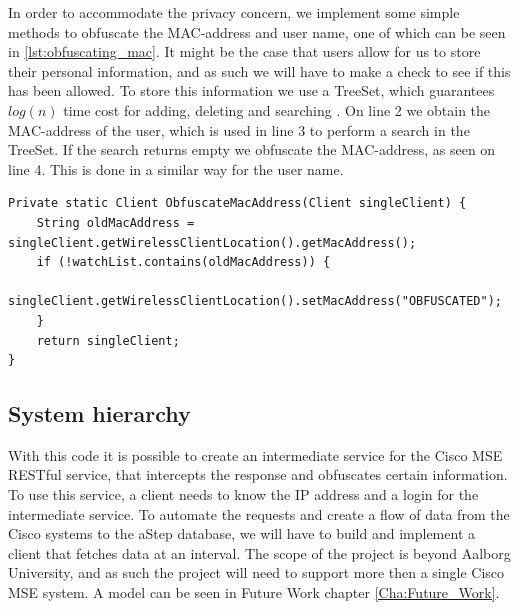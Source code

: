 In order to accommodate the privacy concern, we implement some simple methods to obfuscate the MAC-address and user name, one of which can be seen in \cref{lst:obfuscating_mac}. It might be the case that users allow for us to store their personal information, and as such we will have to make a check to see if this has been allowed. To store this information we use a TreeSet, which guarantees $log(n)$ time cost for adding, deleting and searching \cite{treeset}. On line 2 we obtain the MAC-address of the user, which is used in line 3 to perform a search in the TreeSet. If the search returns empty we obfuscate the MAC-address, as seen on line 4. This is done in a similar way for the user name.

\begin{lstlisting}[caption={Obfuscating mac-address},label={lst:obfuscating_mac},language=inc_Java]
Private static Client ObfuscateMacAddress(Client singleClient) {
    String oldMacAddress = singleClient.getWirelessClientLocation().getMacAddress();
    if (!watchList.contains(oldMacAddress)) {
        singleClient.getWirelessClientLocation().setMacAddress("OBFUSCATED");
    }
    return singleClient;
}
\end{lstlisting}

\subsection{System hierarchy}\label{subsec:system_hierarchy}
With this code it is possible to create an intermediate service for the Cisco MSE RESTful service, that intercepts the response and obfuscates certain information. To use this service, a client needs to know the IP address and a login for the intermediate service. To automate the requests and create a flow of data from the Cisco systems to the aStep database, we will have to build and implement a client that fetches data at an interval. The scope of the project is beyond Aalborg University, and as such the project will need to support more then a single Cisco MSE system. A model can be seen in Future Work chapter \ref{Cha:Future_Work}. 